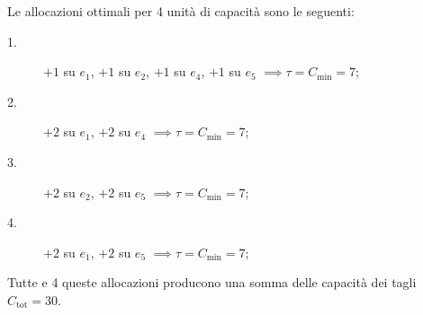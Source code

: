 \begin{alphaparts}
    
    \questionpart
    Le allocazioni ottimali per 4 unità di capacità sono le seguenti:

    \begin{description}
        \item[1.] \(+ 1\) su \(e_1\), \(+ 1\) su \(e_2\), \(+ 1\) su \(e_4\), \(+ 1\) su \(e_5\) \(\implies \tau = C_{\min} = 7\);
        \item[2.] \(+ 2\) su \(e_1\), \(+ 2\) su \(e_4\) \(\implies \tau = C_{\min} = 7\);
        \item[3.] \(+ 2\) su \(e_2\), \(+ 2\) su \(e_5\) \(\implies \tau = C_{\min} = 7\);
        \item[4.] \(+ 2\) su \(e_1\), \(+ 2\) su \(e_5\) \(\implies \tau = C_{\min} = 7\);  
    \end{description}

    Tutte e 4 queste allocazioni producono una somma delle capacità dei tagli \(C_{\text{tot}} = 30\).
    \end{alphaparts}